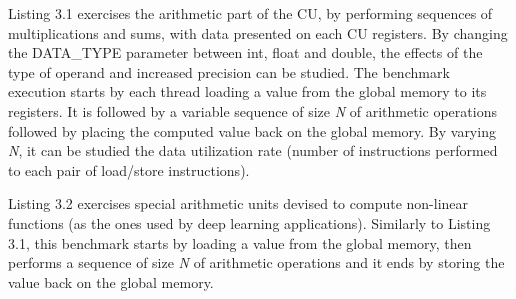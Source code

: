 Listing 3.1 exercises the arithmetic part of the CU, by performing sequences of multiplications and sums, with data presented on each CU registers. By changing the DATA\_TYPE parameter between int,  float and double, the effects of the type of operand and increased precision can be studied. The benchmark execution starts by each thread loading a value from the global memory to its registers. It is followed by a variable sequence of size \textit{N} of arithmetic operations followed by placing the computed value back on the global memory. By varying \textit{N}, it can be studied the data utilization rate (number of instructions performed to each pair of load/store instructions).

Listing 3.2 exercises special arithmetic units devised to compute non-linear functions (as the ones used by deep learning applications). Similarly to Listing 3.1, this benchmark starts by loading a value from the global memory, then performs a sequence of size \textit{N} of arithmetic operations and it ends by storing the value back on the global memory.



